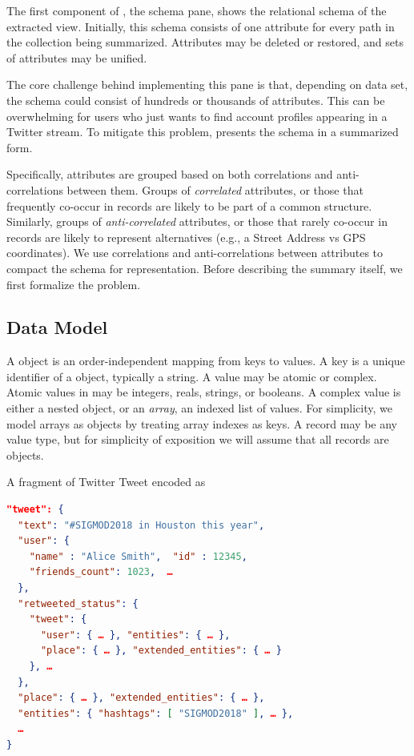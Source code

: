 The first component of \systemnametwo, the schema pane, shows the relational schema of the extracted view.
Initially, this schema consists of one attribute for every path in the \json collection being summarized.
Attributes may be deleted or restored, and sets of attributes may be unified.

The core challenge behind implementing this pane is that, depending on data set, the schema could consist of hundreds or thousands of attributes.
This can be overwhelming for users who just wants to find account profiles appearing in a Twitter stream.
To mitigate this problem, \systemnametwo presents the schema in a summarized form.

Specifically, attributes are grouped based on both correlations and anti-correlations between them.
Groups of \emph{correlated} attributes, or those that frequently co-occur in \json records are likely to be part of a common structure.
Similarly, groups of \emph{anti-correlated} attributes, or those that rarely co-occur in \json records are likely to represent alternatives (e.g., a Street Address vs GPS coordinates).  
We use correlations and anti-correlations between attributes to compact the schema for representation.
Before describing the summary itself, we first formalize the problem.


\subsection{Data Model}
A \json object is an order-independent mapping from keys to values.
A key is a unique identifier of a \json object, typically a string.
A value may be atomic or complex. 
Atomic values in \json may be integers, reals, strings, or booleans.
A complex value is either a nested object, or an \textit{array}, an indexed list of values.  
For simplicity, we model arrays as objects by treating array indexes as keys.
A \json record may be any value type, but for simplicity of exposition we will assume that all records are objects.  
\begin{example}
\label{example:jsonobject}
A fragment of Twitter Tweet encoded as \json
\begin{lstlisting}[language=json]
"tweet": {
  "text": "#SIGMOD2018 in Houston this year",
  "user": { 
    "name" : "Alice Smith",  "id" : 12345, 
    "friends_count": 1023,  …
  },
  "retweeted_status": {
    "tweet": {
      "user": { … }, "entities": { … }, 
      "place": { … }, "extended_entities": { … }
    }, …
  },
  "place": { … }, "extended_entities": { … },  
  "entities": { "hashtags": [ "SIGMOD2018" ], … },
  …
}
\end{lstlisting}
\end{example}

